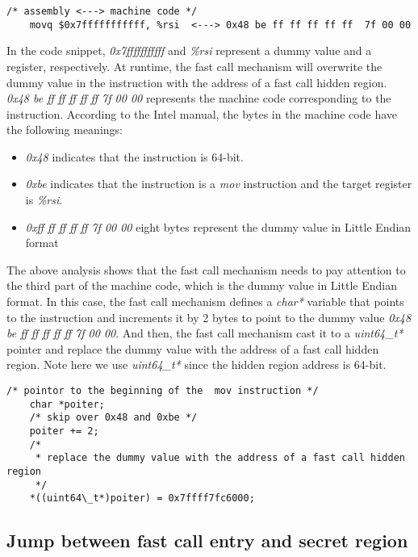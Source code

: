   \begin{lstlisting}[style=CStyle]
    /* assembly <---> machine code */
    movq $0x7fffffffffff, %rsi  <---> 0x48 be ff ff ff ff ff  7f 00 00
  \end{lstlisting}

  In the code snippet, \emph{0x7fffffffffff} and \emph{\%rsi} represent a dummy 
  value and a register, respectively. At runtime, the fast call mechanism 
  will overwrite the dummy value in the instruction with the address of a 
  fast call hidden region. \emph{0x48 be ff ff ff ff ff  7f 00 00} represents the 
  machine code corresponding to the instruction. According to the Intel manual, 
  the bytes in the machine code have the following meanings:
  
  \begin{itemize}
    \item \emph{0x48} indicates that the instruction is 64-bit.
    \item \emph{0xbe} indicates that the instruction is a \emph{mov} instruction and the target register is \emph{\%rsi}.
    \item \emph{0xff ff ff ff ff 7f 00 00 } eight bytes represent the dummy value in Little Endian format
  \end{itemize}
  
  The above analysis shows that the fast call mechanism needs to pay attention to 
  the third part of the machine code, which is the dummy value in Little Endian 
  format. In this case, the fast call mechanism defines a \emph{char*} variable that 
  points to the instruction and increments it by 2 bytes to point to the 
  dummy value \emph{0x48 be ff ff ff ff ff  7f 00 00}. And then, the fast call mechanism cast it to a \emph{uint64\_t*}
  pointer and replace the dummy value with the address of a fast call hidden 
  region. Note here we use \emph{uint64\_t*} since the hidden region address is 64-bit.

  \begin{lstlisting}[style=CStyle]
    /* pointor to the beginning of the  mov instruction */ 
    char *poiter;
    /* skip over 0x48 and 0xbe */ 
    poiter += 2; 
    /* 
     * replace the dummy value with the address of a fast call hidden region 
     */  
    *((uint64\_t*)poiter) = 0x7ffff7fc6000; 
  \end{lstlisting}


\subsection{Jump between fast call entry and secret region}

